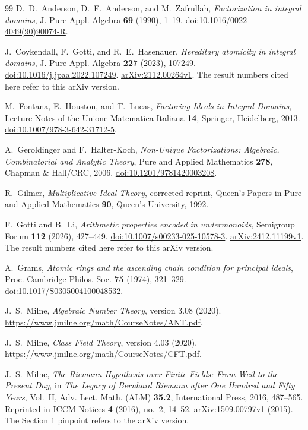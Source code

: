 \documentclass[11pt]{article}
\theoremstyle{plain}
\theoremstyle{definition}
\theoremstyle{remark}
\begin{document}
\begin{thebibliography}{99}
D.~D.~Anderson, D.~F.~Anderson, and M.~Zafrullah,
\emph{Factorization in integral domains},
J. Pure Appl. Algebra \textbf{69} (1990), 1--19.
\href{https://doi.org/10.1016/0022-4049(90)90074-R}{doi:10.1016/0022-4049(90)90074-R}.

J.~Coykendall, F.~Gotti, and R.~E.~Hasenauer,
\emph{Hereditary atomicity in integral domains},
J. Pure Appl. Algebra \textbf{227} (2023), 107249.
\href{https://doi.org/10.1016/j.jpaa.2022.107249}{doi:10.1016/j.jpaa.2022.107249}.
\href{https://arxiv.org/abs/2112.00264v1}{arXiv:2112.00264v1}.
The result numbers cited here refer to this arXiv version.

M.~Fontana, E.~Houston, and T.~Lucas,
\emph{Factoring Ideals in Integral Domains},
Lecture Notes of the Unione Matematica Italiana \textbf{14},
Springer, Heidelberg, 2013.
\href{https://doi.org/10.1007/978-3-642-31712-5}{doi:10.1007/978-3-642-31712-5}.

A.~Geroldinger and F.~Halter-Koch,
\emph{Non-Unique Factorizations: Algebraic, Combinatorial and Analytic
Theory}, Pure and Applied Mathematics \textbf{278},
Chapman \& Hall/CRC, 2006.
\href{https://doi.org/10.1201/9781420003208}{doi:10.1201/9781420003208}.

R.~Gilmer, \emph{Multiplicative Ideal Theory}, corrected reprint,
Queen's Papers in Pure and Applied Mathematics \textbf{90},
Queen's University, 1992.

F.~Gotti and B.~Li, \emph{Arithmetic properties encoded in undermonoids},
Semigroup Forum \textbf{112} (2026), 427--449.
\href{https://doi.org/10.1007/s00233-025-10578-3}{doi:10.1007/s00233-025-10578-3}.
\href{https://arxiv.org/abs/2412.11199v1}{arXiv:2412.11199v1}.
The result numbers cited here refer to this arXiv version.

A.~Grams, \emph{Atomic rings and the ascending chain condition for
principal ideals}, Proc. Cambridge Philos. Soc. \textbf{75} (1974), 321--329.
\href{https://doi.org/10.1017/S0305004100048532}{doi:10.1017/S0305004100048532}.

J.~S.~Milne, \emph{Algebraic Number Theory}, version 3.08 (2020).
\url{https://www.jmilne.org/math/CourseNotes/ANT.pdf}.

J.~S.~Milne, \emph{Class Field Theory}, version 4.03 (2020).
\url{https://www.jmilne.org/math/CourseNotes/CFT.pdf}.

J.~S.~Milne, \emph{The Riemann Hypothesis over Finite Fields: From Weil
to the Present Day}, in \emph{The Legacy of Bernhard Riemann after One
Hundred and Fifty Years}, Vol.~II, Adv. Lect. Math. (ALM) \textbf{35.2},
International Press, 2016, 487--565.
Reprinted in ICCM Notices \textbf{4} (2016), no.~2, 14--52.
\href{https://arxiv.org/abs/1509.00797v1}{arXiv:1509.00797v1} (2015).
The Section 1 pinpoint refers to the arXiv version.
\end{thebibliography}
\end{document}
